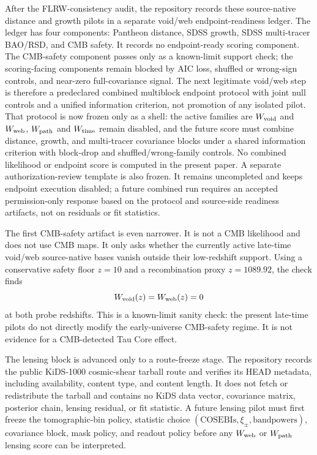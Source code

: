 \documentclass[11pt]{article}
\begin{document}
After the FLRW-consistency audit, the repository records these source-native
distance and growth pilots in a separate void/web endpoint-readiness ledger.
The ledger has four components: Pantheon distance, SDSS growth, SDSS
multi-tracer BAO/RSD, and CMB safety. It records no endpoint-ready scoring
component. The CMB-safety component passes only as a known-limit support check;
the scoring-facing components remain blocked by AIC loss, shuffled or
wrong-sign controls, and near-zero full-covariance signal. The next legitimate
void/web step is therefore a predeclared combined multiblock endpoint protocol
with joint null controls and a unified information criterion, not promotion of
any isolated pilot.
That protocol is now frozen only as a shell: the active families are
\(W_{\rm void}\) and \(W_{\rm web}\), \(W_{\rm path}\) and \(W_{\rm time}\)
remain disabled, and the future score must combine distance, growth, and
multi-tracer covariance blocks under a shared information criterion with
block-drop and shuffled/wrong-family controls. No combined likelihood or
endpoint score is computed in the present paper.
A separate authorization-review template is also frozen. It remains
uncompleted and keeps endpoint execution disabled; a future combined run
requires an accepted permission-only response based on the protocol and
source-side readiness artifacts, not on residuals or fit statistics.

The first CMB-safety artifact is even narrower. It is not a CMB likelihood and
does not use CMB maps. It only asks whether the currently active late-time
void/web source-native bases vanish outside their low-redshift support. Using a
conservative safety floor \(z=10\) and a recombination proxy \(z=1089.92\), the
check finds
\[
W_{\rm void}(z)=W_{\rm web}(z)=0
\]
at both probe redshifts. This is a known-limit sanity check: the present
late-time pilots do not directly modify the early-universe CMB-safety regime.
It is not evidence for a CMB-detected Tau Core effect.

The lensing block is advanced only to a route-freeze stage. The repository
records the public KiDS-1000 cosmic-shear tarball route and verifies its HEAD
metadata, including availability, content type, and content length. It does not
fetch or redistribute the tarball and contains no KiDS data vector, covariance
matrix, posterior chain, lensing residual, or fit statistic. A future lensing
pilot must first freeze the tomographic-bin policy, statistic choice
\((\mathrm{COSEBIs},\xi_\pm,\mathrm{bandpowers})\), covariance block, mask
policy, and readout policy before any \(W_{\rm web}\) or \(W_{\rm path}\)
lensing score can be interpreted.
\end{document}
